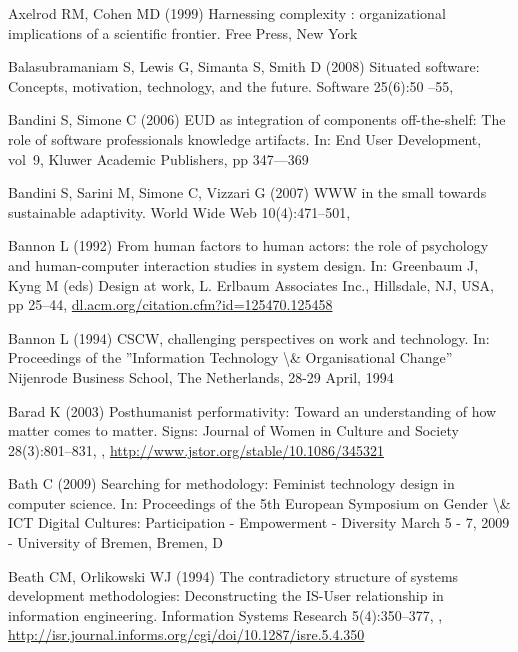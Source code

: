 \documentclass{article}
\begin{document}
\begin{thebibliography}{193}
Axelrod RM, Cohen MD (1999) Harnessing complexity : organizational implications
  of a scientific frontier. Free Press, New York

Balasubramaniam S, Lewis G, Simanta S, Smith D (2008) Situated software:
  Concepts, motivation, technology, and the future. Software 25(6):50 --55,

Bandini S, Simone C (2006) {EUD} as integration of components off-the-shelf:
  The role of software professionals knowledge artifacts. In: End User
  Development, vol~9, Kluwer Academic Publishers, pp 347---369

Bandini S, Sarini M, Simone C, Vizzari G (2007) {WWW} in the small towards
  sustainable adaptivity. World Wide Web 10(4):471--501,

Bannon L (1992) From human factors to human actors: the role of psychology and
  human-computer interaction studies in system design. In: Greenbaum J, Kyng M
  (eds) Design at work, L. Erlbaum Associates Inc., Hillsdale, {NJ}, {USA}, pp
  25--44, \urlprefix\url{dl.acm.org/citation.cfm?id=125470.125458}

Bannon L (1994) {CSCW}, challenging perspectives on work and technology. In:
  Proceedings of the {''Information} Technology {\textbackslash}\&
  Organisational Change'' Nijenrode Business School, The Netherlands, 28-29
  April, 1994

Barad K (2003) Posthumanist performativity: Toward an understanding of how
  matter comes to matter. Signs: Journal of Women in Culture and Society
  28(3):801--831, ,
  \urlprefix\url{http://www.jstor.org/stable/10.1086/345321}

Bath C (2009) Searching for methodology: Feminist technology design in computer
  science. In: Proceedings of the 5th European Symposium on Gender
  {\textbackslash}\& {ICT} Digital Cultures: Participation - Empowerment -
  Diversity March 5 - 7, 2009 - University of Bremen, Bremen, D

Beath CM, Orlikowski WJ (1994) The contradictory structure of systems
  development methodologies: Deconstructing the {IS-User} relationship in
  information engineering. Information Systems Research 5(4):350--377,
  ,
  \urlprefix\url{http://isr.journal.informs.org/cgi/doi/10.1287/isre.5.4.350}


\end{thebibliography}
\end{document}
